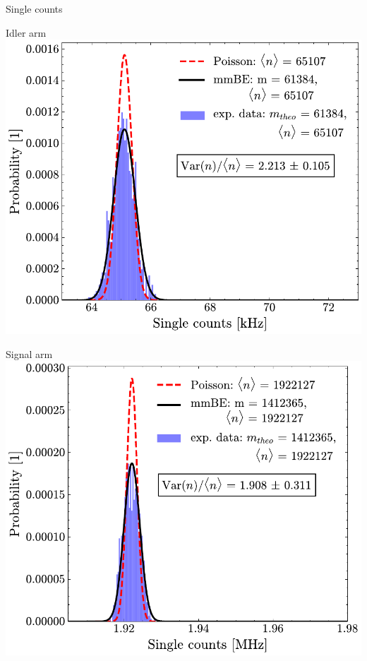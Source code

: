 \documentclass[10pt,aspectratio=43]{beamer}
\begin{document}
	\begin{frame}{Single counts}
		\begin{minipage}{.45\textwidth}
			\centering
			Idler arm
			\vspace{2em}
			\includegraphics[width=\textwidth]{Images/SingleStatisticsIdler_3.pdf}
		\end{minipage}
		\hfill
		\begin{minipage}{.45\textwidth}
			\centering
			Signal arm
			\vspace{2em}
			\includegraphics[width=\textwidth]{Images/SingleStatisticsSignal_3.pdf}
		\end{minipage}
	\end{frame}
	
\end{document}
